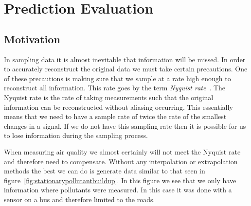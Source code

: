 \chapter{Prediction Evaluation}\label{prediction_evaluation}

	\section{Motivation}\label{prediction_evaluation_motivation}

		In sampling data it is almost inevitable that information will be missed. In order to accurately reconstruct the original data we must take certain precautions. One of these precautions is making sure that we sample at a rate high enough to reconstruct all information. This rate goes by the term \emph{Nyquist rate}~\cite{nyquistrate}. The Nyquist rate is the rate of taking measurements such that the original information can be reconstructed without aliasing occurring. This essentially means that we need to have a sample rate of twice the rate of the smallest changes in a signal. If we do not have this sampling rate then it is possible for us to lose information during the sampling process. 


		When measuring air quality we almost certainly will not meet the Nyquist rate and therefore need to compensate. Without any interpolation or extrapolation methods the best we can do is generate data similar to that seen in figure~\ref{fig:stationarypollutantbuildup}. In this figure we see that we only have information where pollutants were measured. In this case it was done with a sensor on a bus and therefore limited to the roads. 



